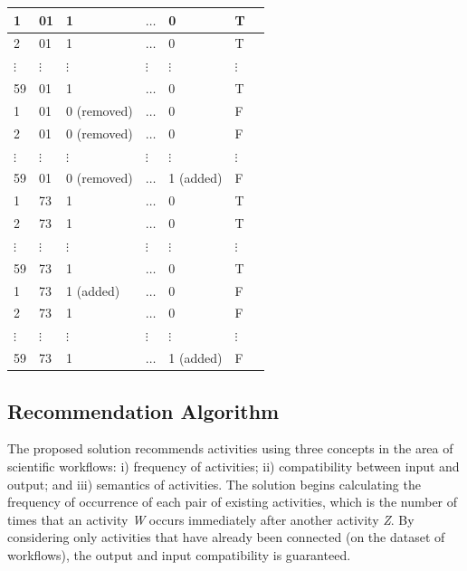 \documentclass[a0, portrait]{a0poster}
\begin{document}
\begin{multicols}{2}
{\begin{center}
\begin{tabular}{|l|l|l|l|l|l|l|}
1    			& 01   	 		& 1 	   				& \(\ldots\)        & 0     			& T    				\\ \hline
2    			& 01      		& 1    				& \(\ldots\)        & 0     			& T  	  				\\ \hline
\(\vdots\)  	& \(\vdots\)    & \(\vdots\)    	& \(\vdots\)       & \(\vdots\)    & \(\vdots\)    	\\ \hline
59          	& 01     			& 1    				& \(\ldots\)        & 0     			& T             		\\ \hline
1    			& 01     			& 0 (removed)   & \(\ldots\)        & 0     			& F            		 	\\ \hline
2   			& 01     			& 0 (removed)   & \(\ldots\)        & 0     			& F            		 	\\ \hline
\(\vdots\)  	& \(\vdots\)    & \(\vdots\)    	& \(\vdots\)        & \(\vdots\)   & \(\vdots\)    	\\ \hline
59          	& 01     			& 0 (removed)   & \(\ldots\)        & 1 (added)   & F             		\\ \hline
1    			& 73     			& 1    				& \(\ldots\)        & 0     			& T             		\\ \hline
2    			& 73     			& 1    				& \(\ldots\)        & 0     			& T             		\\ \hline
\(\vdots\)  	& \(\vdots\)    & \(\vdots\)    	& \(\vdots\)        & \(\vdots\)   & \(\vdots\)    	\\ \hline
59          	& 73     			& 1    				& \(\ldots\)        & 0     			& T             		\\ \hline
1    			& 73     			& 1 (added)    	& \(\ldots\)        & 0     			& F           			\\ \hline
2    			& 73     			& 1   					& \(\ldots\)        & 0     			& F             		\\ \hline
\(\vdots\)  	& \(\vdots\)    & \(\vdots\)    	& \(\vdots\)        & \(\vdots\)   & \(\vdots\)    	\\ \hline
59          	& 73     			& 1    				& \(\ldots\)        & 1 (added)    & F             		\\ \hline

\end{tabular} \label{Tab_matriz_adaptada}
\end{center}
}
\vspace{0.25cm}

\subsection*{Recommendation Algorithm}
The proposed solution recommends activities using three concepts in the area of scientific workflows: i) frequency of activities; ii) compatibility between input and output; and iii) semantics of activities. The solution begins calculating the frequency of occurrence of each pair of existing activities, which is the number of times that an activity \emph{W} occurs immediately after another activity \emph{Z}. By considering only activities that have already been connected (on the dataset of workflows), the output and input compatibility is guaranteed.


\end{multicols}
\end{document}
